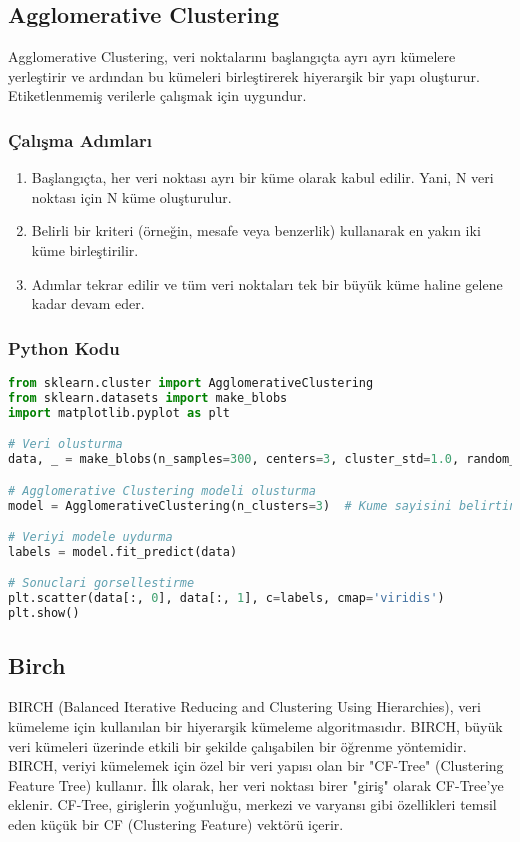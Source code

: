 \newpage

\subsection{Agglomerative Clustering}
Agglomerative Clustering, veri noktalarını başlangıçta ayrı ayrı kümelere yerleştirir ve ardından bu kümeleri birleştirerek hiyerarşik bir yapı oluşturur. Etiketlenmemiş verilerle çalışmak için uygundur.

\subsubsection{Çalışma Adımları}
\begin{enumerate}
    \item Başlangıçta, her veri noktası ayrı bir küme olarak kabul edilir. Yani, N veri noktası için N küme oluşturulur.
    \item Belirli bir kriteri (örneğin, mesafe veya benzerlik) kullanarak en yakın iki küme birleştirilir.
    \item Adımlar tekrar edilir ve tüm veri noktaları tek bir büyük küme haline gelene kadar devam eder.
\end{enumerate}

\subsubsection{Python Kodu}

\begin{lstlisting}[language=Python, caption=Scikit-learn'de AgglomerativeClustering.]
from sklearn.cluster import AgglomerativeClustering
from sklearn.datasets import make_blobs
import matplotlib.pyplot as plt

# Veri olusturma
data, _ = make_blobs(n_samples=300, centers=3, cluster_std=1.0, random_state=42)

# Agglomerative Clustering modeli olusturma
model = AgglomerativeClustering(n_clusters=3)  # Kume sayisini belirtin

# Veriyi modele uydurma
labels = model.fit_predict(data)

# Sonuclari gorsellestirme
plt.scatter(data[:, 0], data[:, 1], c=labels, cmap='viridis')
plt.show()
\end{lstlisting}

\newpage

\subsection{Birch}
BIRCH (Balanced Iterative Reducing and Clustering Using Hierarchies), veri kümeleme için kullanılan bir hiyerarşik kümeleme algoritmasıdır. BIRCH, büyük veri kümeleri üzerinde etkili bir şekilde çalışabilen bir öğrenme yöntemidir. BIRCH, veriyi kümelemek için özel bir veri yapısı olan bir "CF-Tree" (Clustering Feature Tree) kullanır. İlk olarak, her veri noktası birer "giriş" olarak CF-Tree'ye eklenir. CF-Tree, girişlerin yoğunluğu, merkezi ve varyansı gibi özellikleri temsil eden küçük bir CF (Clustering Feature) vektörü içerir.

